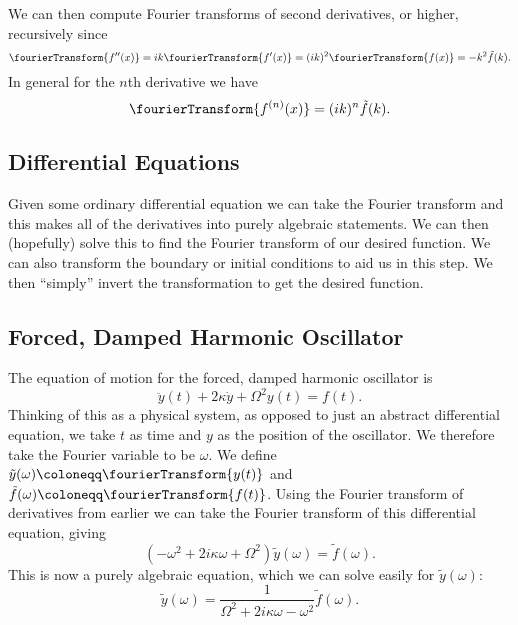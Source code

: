 \documentclass[fleqn]{NotesClass}
\begin{document}
    We can then compute Fourier transforms of second derivatives, or higher, recursively since
    \begin{equation}
        \fourierTransform\{f''(x)\} = ik\fourierTransform\{ f'(x) \} = (ik)^2\fourierTransform\{ f(x) \} = -k^2\tilde{f}(k).
    \end{equation}
    In general for the \(n\)th derivative we have
    \begin{equation}
        \fourierTransform\{ f^{(n)}(x) \} = (ik)^n \tilde{f}(k).
    \end{equation}
    
    \subsection{Differential Equations}
    Given some ordinary differential equation we can take the Fourier transform and this makes all of the derivatives into purely algebraic statements.
    We can then (hopefully) solve this to find the Fourier transform of our desired function.
    We can also transform the boundary or initial conditions to aid us in this step.
    We then \enquote{simply} invert the transformation to get the desired function.
    
    \subsection{Forced, Damped Harmonic Oscillator}
    The equation of motion for the forced, damped harmonic oscillator is
    \begin{equation}
        \ddot{y}(t) + 2\kappa \dot{y} + \Omega^2y(t) = f(t).
    \end{equation}
    Thinking of this as a physical system, as opposed to just an abstract differential equation, we take \(t\) as time and \(y\) as the position of the oscillator.
    We therefore take the Fourier variable to be \(\omega\).
    We define \(\tilde{y}(\omega) \coloneqq \fourierTransform\{ y(t) \}\) and \(\tilde{f}(\omega) \coloneqq \fourierTransform\{ f(t) \}\).
    Using the Fourier transform of derivatives from earlier we can take the Fourier transform of this differential equation, giving
    \begin{equation}
        (-\omega^2 + 2i\kappa\omega + \Omega^2)\tilde{y}(\omega) = \tilde{f}(\omega).
    \end{equation}
    This is now a purely algebraic equation, which we can solve easily for \(\tilde{y}(\omega)\):
    \begin{equation}
        \tilde{y}(\omega) = \frac{1}{\Omega^2 + 2i\kappa\omega - \omega^2} \tilde{f}(\omega).
    \end{equation}
    
\end{document}
